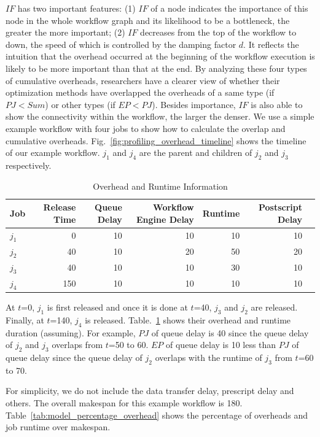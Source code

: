 $IF$ has two important features: (1) $IF$ of a node indicates the importance of this node in the whole workflow graph and its likelihood to be a bottleneck, the greater the more important; (2) $IF$ decreases from the top of the workflow to down, the speed of which is controlled by the damping factor $d$. It reflects the intuition that the overhead occurred at the beginning of the workflow execution is likely to be more important than that at the end.
By analyzing these four types of cumulative overheads, researchers have a clearer view of whether their optimization methods have overlapped the overheads of a same type (if $PJ < Sum$) or other types (if $EP < PJ$). Besides importance, $IF$ is also able to show the connectivity within the workflow, the larger the denser. 
We use a simple example workflow with four jobs to show how to calculate the overlap and cumulative overheads. Fig.~\ref{fig:profiling_overhead_timeline} shows the timeline of our example workflow. $j_1$ and $j_4$ are the parent and children of $j_2$ and $j_3$ respectively.
\begin{table}[htb!]
\caption{Overhead and Runtime Information}
\label{tab:profiling_stats}
\centering
\begin{tabular}{lrrrrrr}
\hline
Job & Release Time &Queue Delay & Workflow Engine Delay & Runtime &Postscript Delay\\

\hline

$j_1$ & 0 & 10 & 10 & 10 & 10\\ 
$j_2$ & 40 & 10 &20 &50&20\\
$j_3$ &40&10&10&30&10\\
$j_4$ &150&10&10&10&10\\

\hline
\end{tabular}
\end{table} 


At $t$=0,  $j_1$ is first released and once it is done at $t$=40, $j_3$ and $j_2$ are released. Finally, at $t$=140, $j_4$ is released. Table.~\ref{tab:profiling_stats} shows their overhead and runtime duration (assuming). 
For example, $PJ$ of queue delay is 40 since the queue delay of $j_2$ and $j_3$ overlaps from $t$=50 to 60. $EP$ of queue delay is 10 less than $PJ$ of queue delay since the queue delay of $j_2$ overlaps with the runtime of $j_3$ from $t$=60 to 70. 

For simplicity, we do not include the data transfer delay, prescript delay and others. The overall makespan for this example workflow is 180. Table~\ref{tab:model_percentage_overhead} shows the percentage of overheads and job runtime over makespan.  

